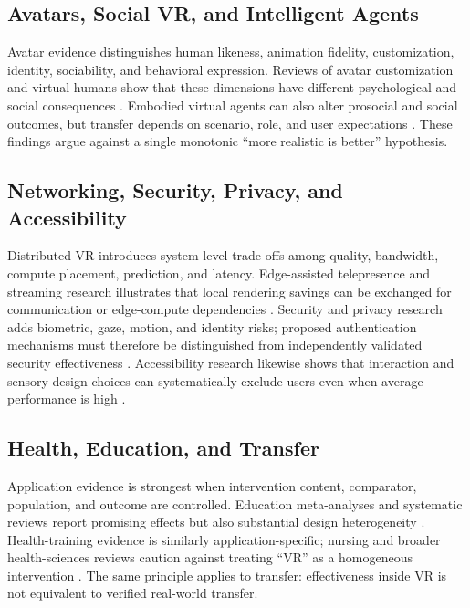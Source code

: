 \subsection{Avatars, Social VR, and Intelligent Agents}
Avatar evidence distinguishes human likeness, animation fidelity, customization, identity, sociability, and behavioral expression. Reviews of avatar customization and virtual humans show that these dimensions have different psychological and social consequences \cite{Ouhnni2025AvatarReview,VirtualHumans2026,HumanlikeAvatars2024}. Embodied virtual agents can also alter prosocial and social outcomes, but transfer depends on scenario, role, and user expectations \cite{Yousefi2024ProsocialEVA}. These findings argue against a single monotonic ``more realistic is better'' hypothesis.

\subsection{Networking, Security, Privacy, and Accessibility}
Distributed VR introduces system-level trade-offs among quality, bandwidth, compute placement, prediction, and latency. Edge-assisted telepresence and streaming research illustrates that local rendering savings can be exchanged for communication or edge-compute dependencies \cite{Xu2023VRStreaming}. Security and privacy research adds biometric, gaze, motion, and identity risks; proposed authentication mechanisms must therefore be distinguished from independently validated security effectiveness \cite{Giaretta2025VRSecurity,Agarwal2024BiometricsXR,Heruatmadja2023VRBiometricAuth,EyeVEIL2019,Lin2022DigitalBodyPrivacy}. Accessibility research likewise shows that interaction and sensory design choices can systematically exclude users even when average performance is high \cite{Dudley2023InclusiveImmersion,Monteiro2026HapticAccessibility}.

\subsection{Health, Education, and Transfer}
Application evidence is strongest when intervention content, comparator, population, and outcome are controlled. Education meta-analyses and systematic reviews report promising effects but also substantial design heterogeneity \cite{Merchant2014VREducationMeta,Luo2021VREducation,DiNatale2020IVREducation,Lawson2024Confounded,Karcher2025QualityMethods}. Health-training evidence is similarly application-specific; nursing and broader health-sciences reviews caution against treating ``VR'' as a homogeneous intervention \cite{Woon2021NursingVR,HealthSciencesVR2025}. The same principle applies to transfer: effectiveness inside VR is not equivalent to verified real-world transfer.

